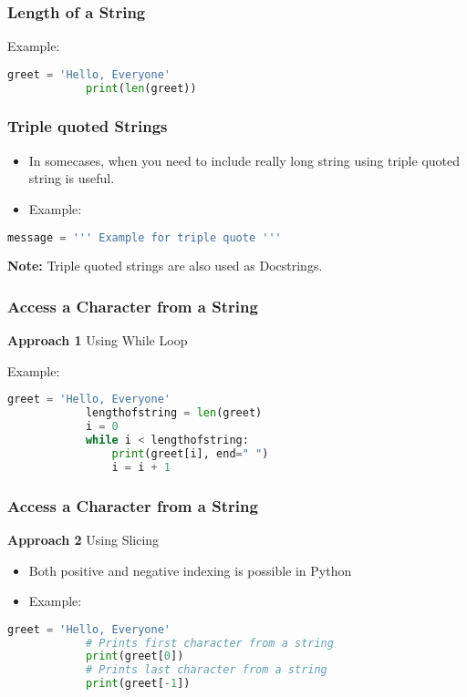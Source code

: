 \documentclass[14pt]{beamer}
\begin{document}
    \begin{frame}[containsverbatim]
        \frametitle{Length of a String}
        \alert{Example:}  
        \begin{lstlisting}[language=Python]
            greet = 'Hello, Everyone'
            print(len(greet))
        \end{lstlisting}
    \end{frame}
    \begin{frame}[containsverbatim]
        \frametitle{Triple quoted Strings}
        \begin{itemize}
            \item In somecases, when you need to include really long string using triple quoted string is useful.
            \item \alert{Example:}
        \end{itemize}
        \begin{lstlisting}[language=Python]
            message = ''' Example for triple quote '''
        \end{lstlisting}
        \textbf{Note:} Triple quoted strings are also used as Docstrings.
    \end{frame}
    \begin{frame}[containsverbatim]
        \frametitle{Access a Character from a String}
        \textbf{Approach 1} Using While Loop
        
        \alert{Example:} 
        \begin{lstlisting}[language=Python]
            greet = 'Hello, Everyone'
            lengthofstring = len(greet)
            i = 0
            while i < lengthofstring:
                print(greet[i], end=" ")
                i = i + 1
        \end{lstlisting}
    \end{frame}
    \begin{frame}[containsverbatim]
        \frametitle{Access a Character from a String}
        \textbf{Approach 2} Using Slicing
        \begin{itemize}
            \item Both positive and negative indexing is possible in Python
            \item \alert{Example:}
        \end{itemize}
        \begin{lstlisting}[language=Python]
            greet = 'Hello, Everyone'
            # Prints first character from a string
            print(greet[0]) 
            # Prints last character from a string
            print(greet[-1]) 
        \end{lstlisting}
    \end{frame}
\end{document}
